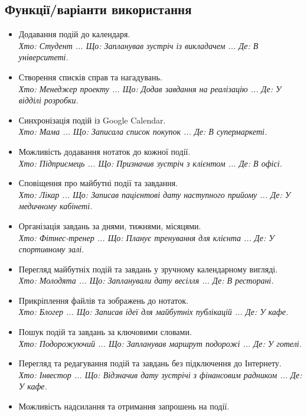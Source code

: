 \documentclass[oneside,14pt]{extarticle}
\begin{document}
\begin{normalsize}
	\subsection*{Функції/варіанти використання}
	\begin{itemize}
		\item Додавання подій до календаря.\\
		\textit{Хто: Студент ... Що: Запланував зустріч із викладачем ... Де: В університеті.}
		\item Створення списків справ та нагадувань.\\
		\textit{Хто: Менеджер проекту ... Що: Додав завдання на реалізацію ... Де: У відділі розробки.}
		\item Синхронізація подій із Google Calendar.\\
		\textit{Хто: Мама ... Що: Записала список покупок ... Де: В супермаркеті.}
		\item Можливість додавання нотаток до кожної події.\\
		\textit{Хто: Підприємець ... Що: Призначив зустріч з клієнтом ... Де: В офісі.}
		\item Сповіщення про майбутні події та завдання.\\
		\textit{Хто: Лікар ... Що: Записав пацієнтові дату наступного прийому ... Де: У медичному кабінеті.}
		\item Організація завдань за днями, тижнями, місяцями.\\
		\textit{Хто: Фітнес-тренер ... Що: Планує тренування для клієнта ... Де: У спортивному залі.}
		\item Перегляд майбутніх подій та завдань у зручному календарному вигляді.\\
		\textit{Хто: Молодята ... Що: Запланували дату весілля ... Де: В ресторані.}
		\item Прикріплення файлів та зображень до нотаток.\\
		\textit{Хто: Блогер ... Що: Записав ідеї для майбутніх публікацій ... Де: У кафе.}
		\item Пошук подій та завдань за ключовими словами.\\
		\textit{Хто: Подорожуючий ... Що: Запланував маршрут подорожі ... Де: У готелі.}
		\item Перегляд та редагування подій та завдань без підключення до Інтернету.\\
		\textit{Хто: Інвестор ... Що: Відзначив дату зустрічі з фінансовим радником ... Де: У кафе.}
		\item Можливість надсилання та отримання запрошень на події.\\

\end{itemize}
\end{normalsize}
\end{document}
